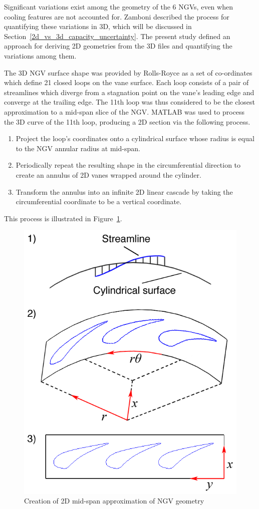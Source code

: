 \documentclass[a4paper, 11pt, oneside]{report}
\begin{document}
Significant variations exist among the geometry of the 6 NGVs, even when cooling features are not accounted for. Zamboni described the process for quantifying these variations in 3D, which will be discussed in Section~\ref{2d_vs_3d_capacity_uncertainty}. The present study defined an approach for deriving 2D geometries from the 3D files and quantifying the variations among them.

The 3D NGV surface shape was provided by Rolls-Royce as a set of co-ordinates which define 21 closed loops on the vane surface. Each loop consists of a pair of streamlines which diverge from a stagnation point on the vane's leading edge and converge at the trailing edge. The 11th loop was thus considered to be the closest approximation to a mid-span slice of the NGV. MATLAB was used to process the 3D curve of the 11th loop, producing a 2D section via the following process. 
\begin{enumerate}
  \item Project the loop's coordinates onto a cylindrical surface whose radius is equal to the NGV annular radius at mid-span.
  \item Periodically repeat the resulting shape in the circumferential direction to create an annulus of 2D vanes wrapped around the cylinder.
  \item Transform the annulus into an infinite 2D linear cascade by taking the circumferential coordinate to be a vertical coordinate.
\end{enumerate}
This process is illustrated in Figure~\ref{fig:2d_geometry_creation}.

\begin{figure}[H]
	\centering
	\includegraphics[width=.6\textwidth]{figs/2d_geometry_creation.png}
	\caption{Creation of 2D mid-span approximation of NGV geometry}
	\label{fig:2d_geometry_creation}
\end{figure}
\end{document}
